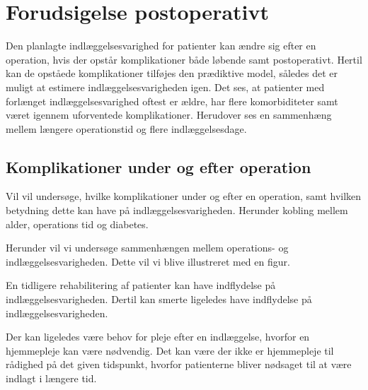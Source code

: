 \section{Forudsigelse postoperativt}
Den planlagte indlæggelsesvarighed for patienter kan ændre sig efter en operation, hvis der opstår komplikationer både løbende samt postoperativt. Hertil kan de opståede komplikationer tilføjes den prædiktive model, således det er muligt at estimere indlæggelsesvarigheden igen. Det ses, at patienter med forlænget indlæggelsesvarighed oftest er ældre, har flere komorbiditeter samt været igennem uforventede komplikationer. \cite{Krell2014} Herudover ses en sammenhæng mellem længere operationstid og flere indlæggelsesdage.\cite{Kjeldsen2015b}


\subsection{Komplikationer under og efter operation}
Vil vil undersøge, hvilke komplikationer under og efter en operation, samt hvilken betydning dette kan have på indlæggelsesvarigheden. Herunder kobling mellem alder, operations tid og diabetes. 

Herunder vil vi undersøge sammenhængen mellem operations- og indlæggelsesvarigheden. Dette vil vi blive illustreret med en figur.


En tidligere rehabilitering af patienter kan have indflydelse på indlæggelsesvarigheden. Dertil kan smerte ligeledes have indflydelse på indlæggelsesvarigheden.


Der kan ligeledes være behov for pleje efter en indlæggelse, hvorfor en hjemmepleje kan være nødvendig. Det kan være der ikke er hjemmepleje til rådighed på det given tidspunkt, hvorfor patienterne bliver nødsaget til at være indlagt i længere tid. 